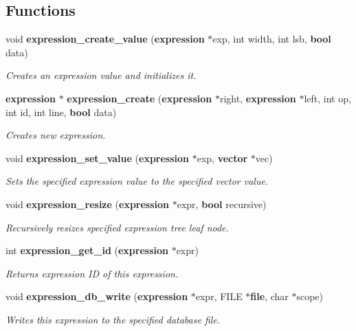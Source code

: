 \subsection*{Functions}
\begin{CompactItemize}
\item 
void {\bf expression\_\-create\_\-value} ({\bf expression} $\ast$exp, int width, int lsb, {\bf bool} data)
\begin{CompactList}\small\item\em Creates an expression value and initializes it.\item\end{CompactList}\item 
{\bf expression} $\ast$ {\bf expression\_\-create} ({\bf expression} $\ast$right, {\bf expression} $\ast$left, int op, int id, int line, {\bf bool} data)
\begin{CompactList}\small\item\em Creates new expression.\item\end{CompactList}\item 
void {\bf expression\_\-set\_\-value} ({\bf expression} $\ast$exp, {\bf vector} $\ast$vec)
\begin{CompactList}\small\item\em Sets the specified expression value to the specified vector value.\item\end{CompactList}\item 
void {\bf expression\_\-resize} ({\bf expression} $\ast$expr, {\bf bool} recursive)
\begin{CompactList}\small\item\em Recursively resizes specified expression tree leaf node.\item\end{CompactList}\item 
int {\bf expression\_\-get\_\-id} ({\bf expression} $\ast$expr)
\begin{CompactList}\small\item\em Returns expression ID of this expression.\item\end{CompactList}\item 
void {\bf expression\_\-db\_\-write} ({\bf expression} $\ast$expr, FILE $\ast${\bf file}, char $\ast$scope)
\begin{CompactList}\small\item\em Writes this expression to the specified database file.\item\end{CompactList}\item 

\end{CompactItemize}
